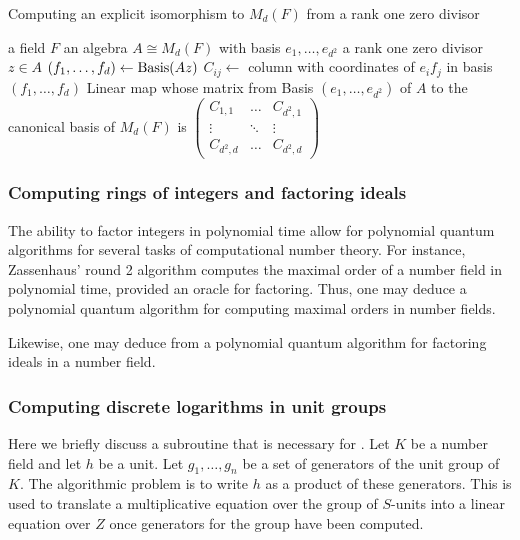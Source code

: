         \begin{algorithm}
        \caption{Computing an explicit isomorphism to \(M_d(F)\) from a rank one zero divisor}
        \label{Algo:ExplicitIsomorphism}
        \begin{algorithmic}
            \REQUIRE a field \(F\)
            \REQUIRE an algebra \(A \cong M_d(F)\) with basis \(e_1,\hdots,e_{d^2}\)
            \REQUIRE a rank one zero divisor \(z \in A\)
            \STATE \((f_1,\hdots,f_d) \leftarrow \operatorname{Basis}(Az)\)
                \STATE \(C_{ij} \leftarrow\) column with coordinates of \(e_if_j\) in basis \((f_1,\hdots,f_d)\)
            \ENDFOR
            \RETURN Linear map whose matrix from Basis \((e_1,\hdots,e_{d^2})\) of \(A\) to the canonical basis of \(M_d(F)\) is \(\begin{pmatrix} C_{1,1} & \hdots &C_{d^2,1} \\ \vdots & \ddots & \vdots \\ C_{d^2,d} & \hdots & C_{d^2,d}\end{pmatrix}\)
        \end{algorithmic}
        \end{algorithm}
\subsubsection{Computing rings of integers and factoring ideals}
    The ability to factor integers in polynomial time allow for polynomial quantum algorithms for several tasks of computational number theory. For instance, Zassenhaus' round 2 algorithm \cite[Algorithm 6.1.8]{cohen2013course} computes the maximal order of a number field in polynomial time, provided an oracle for factoring. Thus, one may deduce a polynomial quantum algorithm for computing maximal orders in number fields.

    Likewise, one may deduce from \cite[Algorithm 2.3.22]{cohen2012advanced} a polynomial quantum algorithm for factoring ideals in a number field.
\subsubsection{Computing discrete logarithms in unit groups}\label{Sec:DiscreteLogUnitGroup}
    Here we briefly discuss a subroutine that is necessary for . Let $K$ be a number field and let $h$ be a unit. Let $g_1,\dots,g_n$ be a set of generators of the unit group of $K$. The algorithmic problem is to write $h$ as a product of these generators. This is used to translate a multiplicative equation over the group of \(S\)-units into a linear equation over \(Z\) once generators for the group have been computed.

